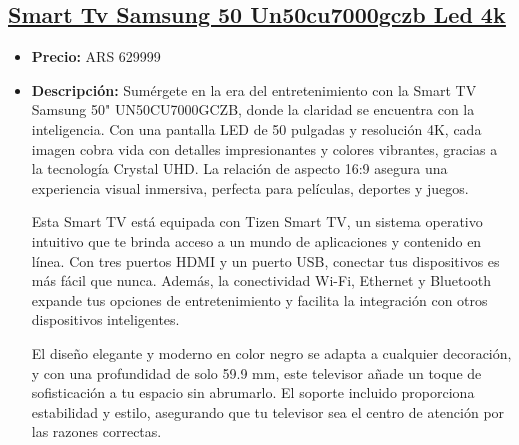 \documentclass{article}
\begin{document}
\begin{adjustwidth}{2em}{}
\vspace{1\baselineskip} %
\end{adjustwidth}


\begin{adjustwidth}{2em}{}

\subsection{\uline{\href{https://www.mercadolibre.com.ar/smart-tv-samsung-50-un50cu7000gczb-led-4k/p/MLA28001260}{Smart Tv Samsung 50 Un50cu7000gczb Led 4k}}}
\begin{itemize}
    \item \textbf{Precio:} ARS 629999
    \item \textbf{Descripción:} Sumérgete en la era del entretenimiento con la Smart TV Samsung 50" UN50CU7000GCZB, donde la claridad se encuentra con la inteligencia. Con una pantalla LED de 50 pulgadas y resolución 4K, cada imagen cobra vida con detalles impresionantes y colores vibrantes, gracias a la tecnología Crystal UHD. La relación de aspecto 16:9 asegura una experiencia visual inmersiva, perfecta para películas, deportes y juegos.

Esta Smart TV está equipada con Tizen Smart TV, un sistema operativo intuitivo que te brinda acceso a un mundo de aplicaciones y contenido en línea. Con tres puertos HDMI y un puerto USB, conectar tus dispositivos es más fácil que nunca. Además, la conectividad Wi-Fi, Ethernet y Bluetooth expande tus opciones de entretenimiento y facilita la integración con otros dispositivos inteligentes.

El diseño elegante y moderno en color negro se adapta a cualquier decoración, y con una profundidad de solo 59.9 mm, este televisor añade un toque de sofisticación a tu espacio sin abrumarlo. El soporte incluido proporciona estabilidad y estilo, asegurando que tu televisor sea el centro de atención por las razones correctas.


\end{itemize}
\end{adjustwidth}
\end{document}
